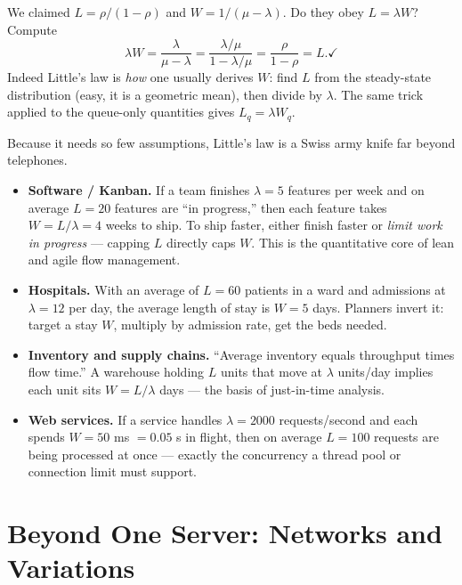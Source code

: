 \begin{example}
\label{ch27:ex-little-check}
We claimed $L = \rho/(1-\rho)$ and $W = 1/(\mu-\lambda)$. Do they obey $L = \lambda W$? Compute
\[
  \lambda W = \frac{\lambda}{\mu - \lambda}
            = \frac{\lambda/\mu}{1 - \lambda/\mu}
            = \frac{\rho}{1-\rho} = L. \checkmark
\]
Indeed Little's law is \emph{how} one usually derives $W$: find $L$ from the steady-state
distribution (easy, it is a geometric mean), then divide by $\lambda$. The same trick applied to the
queue-only quantities gives $L_q = \lambda W_q$.
\end{example}

\begin{applicationbox}
Because it needs so few assumptions, Little's law is a Swiss army knife far beyond telephones.
\begin{itemize}
  \item \textbf{Software / Kanban.} If a team finishes $\lambda = 5$ features per week and on average
  $L = 20$ features are ``in progress,'' then each feature takes $W = L/\lambda = 4$ weeks to ship.
  To ship faster, either finish faster or \emph{limit work in progress} --- capping $L$ directly caps
  $W$. This is the quantitative core of lean and agile flow management.
  \item \textbf{Hospitals.} With an average of $L = 60$ patients in a ward and admissions at
  $\lambda = 12$ per day, the average length of stay is $W = 5$ days. Planners invert it: target a
  stay $W$, multiply by admission rate, get the beds needed.
  \item \textbf{Inventory and supply chains.} ``Average inventory equals throughput times flow
  time.'' A warehouse holding $L$ units that move at $\lambda$ units/day implies each unit sits
  $W = L/\lambda$ days --- the basis of just-in-time analysis.
  \item \textbf{Web services.} If a service handles $\lambda = 2000$ requests/second and each spends
  $W = 50$ ms $= 0.05$ s in flight, then on average $L = 100$ requests are being processed at once
  --- exactly the concurrency a thread pool or connection limit must support.
\end{itemize}
\end{applicationbox}

\section{Beyond One Server: Networks and Variations}
\label{ch27:networks}

